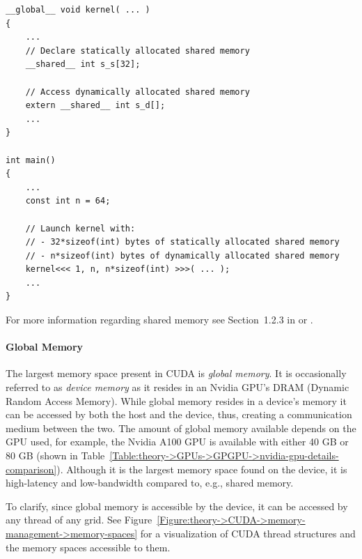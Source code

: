 \begin{lstlisting}[caption={Excerpt of C++ code showcasing the syntax of static and dynamic shared memory allocation.
Note when an array in shared memory is declared using \code{extern}, then the size of the array is determined at run time \cite{NVIDIADecember2022}.
Taken from \citetitle{Harris28January2013} by \citename{Harris28January2013}{author} \cite{Harris28January2013}.},label={Listing:theory->CUDA->memory-management->statically-allocated-shared-memory-example}]
__global__ void kernel( ... )
{
	...
	// Declare statically allocated shared memory
	__shared__ int s_s[32];

	// Access dynamically allocated shared memory
	extern __shared__ int s_d[];
	...
}

int main()
{
	...
	const int n = 64;
	
	// Launch kernel with:
	// - 32*sizeof(int) bytes of statically allocated shared memory
	// - n*sizeof(int) bytes of dynamically allocated shared memory
	kernel<<< 1, n, n*sizeof(int) >>>( ... );
	...
}
\end{lstlisting}

For more information regarding shared memory see Section~1.2.3 in  \cite{Cejka2022} or  \cite{NVIDIADecember2022}.

\paragraph{Global Memory} The largest memory space present in CUDA is \textit{global memory}.
It is occasionally referred to as \textit{device memory} as it resides in an Nvidia GPU's DRAM (Dynamic Random Access Memory).
While global memory resides in a device's memory it can be accessed by both the host and the device, thus, creating a communication medium between the two.
The amount of global memory available depends on the GPU used, for example, the Nvidia A100 GPU is available with either 40 GB or 80 GB (shown in Table~\ref{Table:theory->GPUs->GPGPU->nvidia-gpu-details-comparison}).
Although it is the largest memory space found on the device, it is high-latency and low-bandwidth compared to, e.g., shared memory.

To clarify, since global memory is accessible by the device, it can be accessed by any thread of any grid.
See Figure~\ref{Figure:theory->CUDA->memory-management->memory-spaces} for a visualization of CUDA thread structures and the memory spaces accessible to them.

